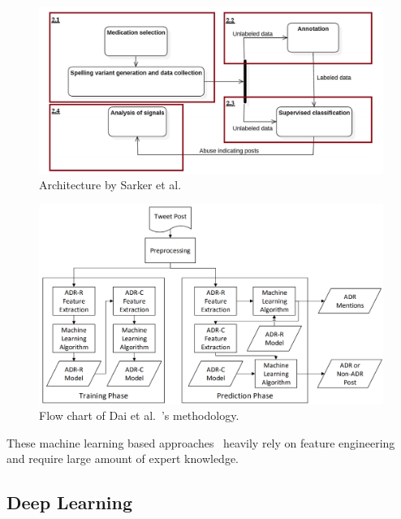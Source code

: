 \begin{figure}[h]
	\centering
	\includegraphics[width=0.99\linewidth]{Figures/h.png}
	\caption{Architecture by Sarker et al.~\cite{sarker2016social}}
	\label{fig:model-sarker}
\end{figure}

\begin{figure}[h]
	\centering
	\includegraphics[width=0.99\linewidth]{Figures/r.png}
	\caption{Flow chart of Dai et al.~\cite{dai2016feature}’s methodology.}
	\label{fig:flowchart-alvaro}
\end{figure}

These machine learning based approaches~\cite{jonnagaddala2016binary, sarker2016social, zhang2016ensemble, dai2016feature, alimova2017automated} heavily rely on feature engineering and require large amount of expert knowledge.

\subsection{Deep Learning}

